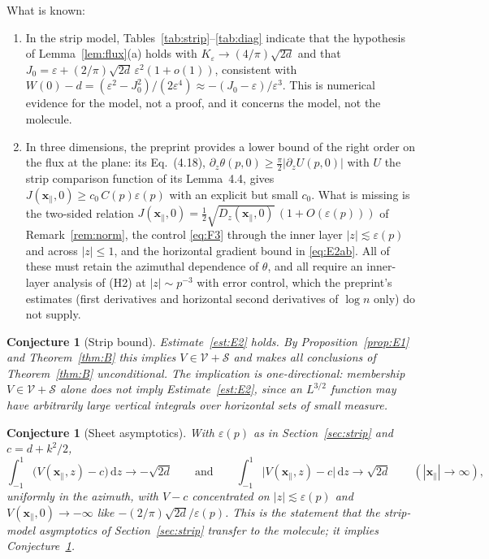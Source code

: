 \documentclass[11pt,a4paper]{article}
\theoremstyle{plain}
\newtheorem{conjecture}[theorem]{Conjecture}
\theoremstyle{definition}
\theoremstyle{remark}
\newcommand{\VV}{\mathcal{V}}
\renewcommand{\SS}{\mathcal{S}}
\newcommand{\dd}{\,\mathrm{d}}
\begin{document}
What is known:
\begin{enumerate}
\item In the strip model, Tables~\ref{tab:strip}--\ref{tab:diag} indicate that the hypothesis of Lemma~\ref{lem:flux}(a) holds with $K_\varepsilon\to(4/\pi)\sqrt{2d}$ and that $J_0=\varepsilon+(2/\pi)\sqrt{2d}\,\varepsilon^2(1+o(1))$, consistent with $W(0)-d=(\varepsilon^2-J_0^2)/(2\varepsilon^4)\approx-(J_0-\varepsilon)/\varepsilon^3$. This is numerical evidence for the model, not a proof, and it concerns the model, not the molecule.
\item In three dimensions, the preprint provides a lower bound of the right order on the flux at the plane: its Eq.~(4.18), $\partial_z\theta(p,0)\ge\tfrac\pi2|\partial_zU(p,0)|$ with $U$ the strip comparison function of its Lemma~4.4, gives $J(\mathbf x_\parallel,0)\ge c_0\,C(p)\varepsilon(p)$ with an explicit but small $c_0$. What is missing is the two-sided relation $J(\mathbf x_\parallel,0)=\tfrac12\sqrt{D_z(\mathbf x_\parallel,0)}\,(1+O(\varepsilon(p)))$ of Remark~\ref{rem:norm}, the control \eqref{eq:F3} through the inner layer $|z|\lesssim\varepsilon(p)$ and across $|z|\le1$, and the horizontal gradient bound in \eqref{eq:E2ab}. All of these must retain the azimuthal dependence of $\theta$, and all require an inner-layer analysis of (H2) at $|z|\sim p^{-3}$ with error control, which the preprint's estimates (first derivatives and horizontal second derivatives of $\log n$ only) do not supply.
\end{enumerate}

\begin{conjecture}[Strip bound]\label{conj:B}
Estimate~\ref{est:E2} holds. By Proposition~\ref{prop:E1} and Theorem~\ref{thm:B} this implies $V\in\VV+\SS$ and makes all conclusions of Theorem~\ref{thm:B} unconditional. The implication is one-directional: membership $V\in\VV+\SS$ alone does not imply Estimate~\ref{est:E2}, since an $L^{3/2}$ function may have arbitrarily large vertical integrals over horizontal sets of small measure.
\end{conjecture}

\begin{conjecture}[Sheet asymptotics]\label{conj:sheet}
With $\varepsilon(p)$ as in Section~\ref{sec:strip} and $c=d+k^2/2$,
\[
\int_{-1}^{1}\big(V(\mathbf x_\parallel,z)-c\big)\dd z\to-\sqrt{2d}\qquad\text{and}\qquad\int_{-1}^{1}\big|V(\mathbf x_\parallel,z)-c\big|\dd z\to\sqrt{2d}\qquad(|\mathbf x_\parallel|\to\infty),
\]
uniformly in the azimuth, with $V-c$ concentrated on $|z|\lesssim\varepsilon(p)$ and $V(\mathbf x_\parallel,0)\to-\infty$ like $-(2/\pi)\sqrt{2d}/\varepsilon(p)$. This is the statement that the strip-model asymptotics of Section~\ref{sec:strip} transfer to the molecule; it implies Conjecture~\ref{conj:B}.
\end{conjecture}
\end{document}
